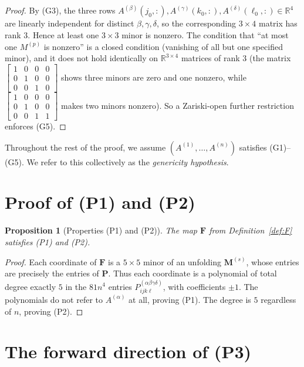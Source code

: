 \documentclass[12pt]{article}
\newtheorem{proposition}[theorem]{Proposition}
\theoremstyle{definition}
\begin{document}
\begin{proof}
By (G3), the three rows $A^{(\beta)}(j_0,:),A^{(\gamma)}(k_0,:),A^{(\delta)}(\ell_0,:)\in\mathbb{R}^4$
are linearly independent for distinct $\beta,\gamma,\delta$, so the corresponding $3\times 4$
matrix has rank $3$. Hence at least one $3\times 3$ minor is nonzero. The condition that
``at most one $M^{(p)}$ is nonzero'' is a closed condition (vanishing of all but one
specified minor), and it does not hold identically on $\mathbb{R}^{3\times 4}$ matrices of
rank $3$ (the matrix $\begin{bmatrix}1&0&0&0\\0&1&0&0\\0&0&1&0\end{bmatrix}$ shows three
minors are zero and one nonzero, while $\begin{bmatrix}1&0&0&0\\0&1&0&0\\0&0&1&1\end{bmatrix}$
makes two minors nonzero). So a Zariski-open further restriction enforces (G5).
\end{proof}

Throughout the rest of the proof, we assume $(A^{(1)},\ldots,A^{(n)})$ satisfies
(G1)--(G5). We refer to this collectively as the \emph{genericity hypothesis}.

\section{Proof of (P1) and (P2)}\label{sec:P1P2}

\begin{proposition}[Properties (P1) and (P2)]\label{prop:P1P2}
The map $\mathbf{F}$ from Definition~\ref{def:F} satisfies (P1) and (P2).
\end{proposition}

\begin{proof}
Each coordinate of $\mathbf{F}$ is a $5\times 5$ minor of an unfolding $\mathbf{M}^{(s)}$, whose
entries are precisely the entries of $\mathbf{P}$. Thus each coordinate is a polynomial of
total degree exactly $5$ in the $81n^4$ entries $P^{(\alpha\beta\gamma\delta)}_{ijk\ell}$,
with coefficients $\pm 1$. The polynomials do not refer to $A^{(\alpha)}$ at all, proving
(P1). The degree is $5$ regardless of $n$, proving (P2).
\end{proof}

\section{The forward direction of (P3)}\label{sec:P3-fwd}
\end{document}
